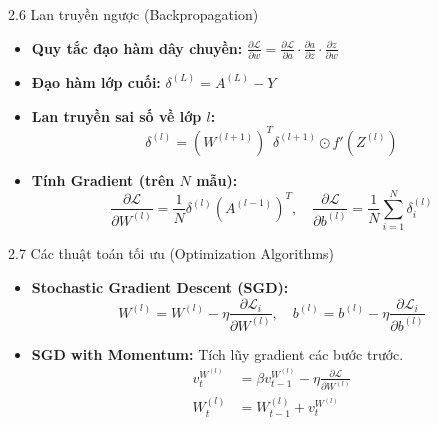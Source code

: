 \documentclass{beamer}
\begin{document}
\begin{frame}{2.6 Lan truyền ngược (Backpropagation)}
  \begin{itemize}
    \item \textbf{Quy tắc đạo hàm dây chuyền:} $\frac{\partial \mathcal{L}}{\partial w} = \frac{\partial \mathcal{L}}{\partial a} \cdot \frac{\partial a}{\partial z} \cdot \frac{\partial z}{\partial w}$
    \item \textbf{Đạo hàm lớp cuối:} $\delta^{(L)} = A^{(L)} - Y$
    \item \textbf{Lan truyền sai số về lớp $l$:}
    \begin{equation*}
        \delta^{(l)} = (W^{(l+1)})^T \delta^{(l+1)} \odot f'(Z^{(l)})
    \end{equation*}
    \item \textbf{Tính Gradient (trên $N$ mẫu):}
    \begin{equation*}
        \frac{\partial \mathcal{L}}{\partial W^{(l)}} = \frac{1}{N} \delta^{(l)} (A^{(l-1)})^T, \quad \frac{\partial \mathcal{L}}{\partial b^{(l)}} = \frac{1}{N} \sum_{i=1}^N \delta_i^{(l)}
    \end{equation*}
  \end{itemize}
\end{frame}

\begin{frame}{2.7 Các thuật toán tối ưu (Optimization Algorithms)}
  \begin{itemize}
    \item \textbf{Stochastic Gradient Descent (SGD):}
    \begin{equation*}
        W^{(l)} = W^{(l)} - \eta \frac{\partial \mathcal{L}_i}{\partial W^{(l)}}, \quad b^{(l)} = b^{(l)} - \eta \frac{\partial \mathcal{L}_i}{\partial b^{(l)}}
    \end{equation*}
    \item \textbf{SGD with Momentum:} Tích lũy gradient các bước trước.
    \begin{align*}
        v_t^{W^{(l)}} &= \beta v_{t-1}^{W^{(l)}} - \eta \frac{\partial \mathcal{L}}{\partial W^{(l)}} \\
        W_t^{(l)} &= W_{t-1}^{(l)} + v_t^{W^{(l)}}
    \end{align*}
  \end{itemize}
\end{frame}
\end{document}
